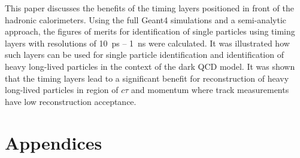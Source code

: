 \documentclass[final,1p,11pt]{elsarticle}
\begin{document}
This paper discusses the benefits of the timing layers positioned in front of the hadronic calorimeters.
Using the full Geant4 simulations and a semi-analytic approach,
the figures of merits for identification of single particles
using timing layers with resolutions of 10~ps -- 1~ns were calculated.
It was illustrated 
how such layers can be used for single particle identification and
identification of heavy long-lived particles in the context of the dark QCD model.
It was shown that the timing layers lead to a significant benefit for reconstruction of heavy long-lived particles 
in region of $c\tau$ and momentum where track measurements have low reconstruction acceptance.

\newpage


\def\bibname{\Large\bf References}


\clearpage
\appendix
\renewcommand{\thesubsection}{\Alph{subsection}}
\section*{Appendices}

\end{document}
